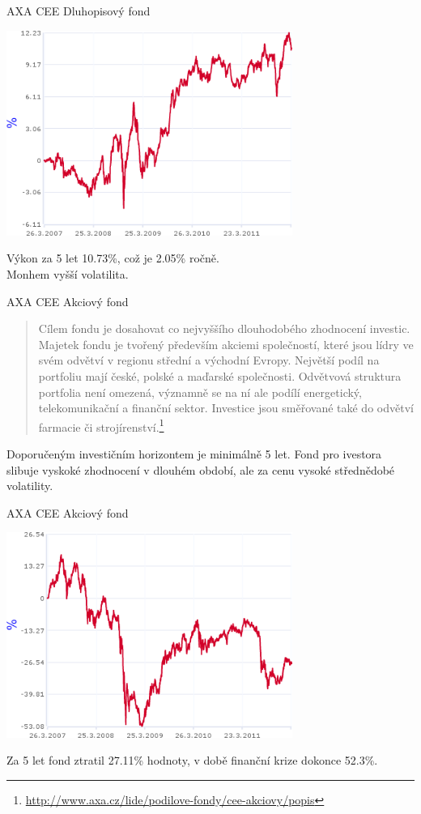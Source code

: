 \documentclass[xcolor=dvipsnames]{beamer}
\begin{document}
			\begin{frame}{AXA CEE Dluhopisový fond}
				\begin{center}
					\includegraphics[width=0.7\textwidth]{axa_cee_dluh.png}
				\end{center}							
				Výkon za 5 let 10.73\%, což je 2.05\% ročně.\\
				Monhem vyšší volatilita.
			\end{frame}
			\begin{frame}{AXA CEE Akciový fond}
				\begin{quote}
				Cílem fondu je dosahovat co nejvyššího dlouhodobého zhodnocení investic. Majetek fondu je tvořený především akciemi společností, které jsou lídry ve svém odvětví v regionu střední a východní Evropy. Největší podíl na portfoliu mají české, polské a maďarské společnosti. Odvětvová struktura portfolia není omezená, významně se na ní ale podílí energetický, telekomunikační a finanční sektor. Investice jsou směřované také do odvětví farmacie či strojírenství.\footnote{\url{http://www.axa.cz/lide/podilove-fondy/cee-akciovy/popis}}
			\end{quote}
			Doporučeným investičním horizontem je minimálně 5 let. Fond pro ivestora slibuje vyskoké zhodnocení v dlouhém období, ale za cenu vysoké střednědobé volatility.
			\end{frame}
			\begin{frame}{AXA CEE Akciový fond}
				\begin{center}
					\includegraphics[width=0.7\textwidth]{axa_cee_akc.png}
				\end{center}							
				Za 5 let fond ztratil 27.11\% hodnoty, v době finanční krize dokonce 52.3\%.
			\end{frame}
\end{document}
